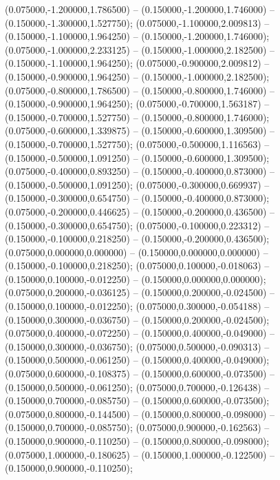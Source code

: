  (0.075000,-1.200000,1.786500) -- (0.150000,-1.200000,1.746000) -- (0.150000,-1.300000,1.527750);
 (0.075000,-1.100000,2.009813) -- (0.150000,-1.100000,1.964250) -- (0.150000,-1.200000,1.746000);
 (0.075000,-1.000000,2.233125) -- (0.150000,-1.000000,2.182500) -- (0.150000,-1.100000,1.964250);
 (0.075000,-0.900000,2.009812) -- (0.150000,-0.900000,1.964250) -- (0.150000,-1.000000,2.182500);
 (0.075000,-0.800000,1.786500) -- (0.150000,-0.800000,1.746000) -- (0.150000,-0.900000,1.964250);
 (0.075000,-0.700000,1.563187) -- (0.150000,-0.700000,1.527750) -- (0.150000,-0.800000,1.746000);
 (0.075000,-0.600000,1.339875) -- (0.150000,-0.600000,1.309500) -- (0.150000,-0.700000,1.527750);
 (0.075000,-0.500000,1.116563) -- (0.150000,-0.500000,1.091250) -- (0.150000,-0.600000,1.309500);
 (0.075000,-0.400000,0.893250) -- (0.150000,-0.400000,0.873000) -- (0.150000,-0.500000,1.091250);
 (0.075000,-0.300000,0.669937) -- (0.150000,-0.300000,0.654750) -- (0.150000,-0.400000,0.873000);
 (0.075000,-0.200000,0.446625) -- (0.150000,-0.200000,0.436500) -- (0.150000,-0.300000,0.654750);
 (0.075000,-0.100000,0.223312) -- (0.150000,-0.100000,0.218250) -- (0.150000,-0.200000,0.436500);
 (0.075000,0.000000,0.000000) -- (0.150000,0.000000,0.000000) -- (0.150000,-0.100000,0.218250);
 (0.075000,0.100000,-0.018063) -- (0.150000,0.100000,-0.012250) -- (0.150000,0.000000,0.000000);
 (0.075000,0.200000,-0.036125) -- (0.150000,0.200000,-0.024500) -- (0.150000,0.100000,-0.012250);
 (0.075000,0.300000,-0.054188) -- (0.150000,0.300000,-0.036750) -- (0.150000,0.200000,-0.024500);
 (0.075000,0.400000,-0.072250) -- (0.150000,0.400000,-0.049000) -- (0.150000,0.300000,-0.036750);
 (0.075000,0.500000,-0.090313) -- (0.150000,0.500000,-0.061250) -- (0.150000,0.400000,-0.049000);
 (0.075000,0.600000,-0.108375) -- (0.150000,0.600000,-0.073500) -- (0.150000,0.500000,-0.061250);
 (0.075000,0.700000,-0.126438) -- (0.150000,0.700000,-0.085750) -- (0.150000,0.600000,-0.073500);
 (0.075000,0.800000,-0.144500) -- (0.150000,0.800000,-0.098000) -- (0.150000,0.700000,-0.085750);
 (0.075000,0.900000,-0.162563) -- (0.150000,0.900000,-0.110250) -- (0.150000,0.800000,-0.098000);
 (0.075000,1.000000,-0.180625) -- (0.150000,1.000000,-0.122500) -- (0.150000,0.900000,-0.110250);
